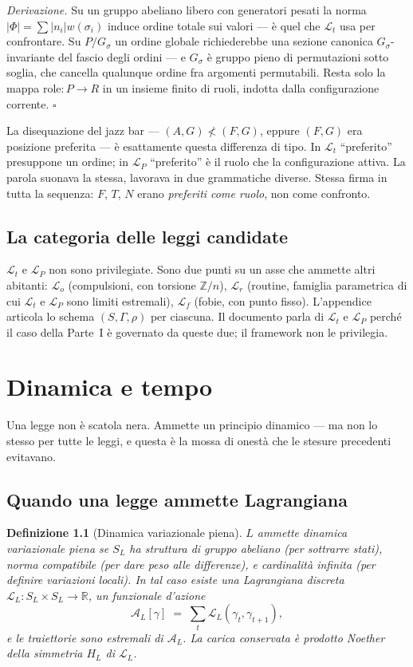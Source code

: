 \documentclass[
    oneside,                 %
    openany,                 %
    titlepage,
    11pt,
    a4paper,
    italian,
    DIV=14,                  %
    headinclude,
    footinclude=true,
    cleardoublepage=empty
]{scrbook}
\theoremstyle{ctplain}
\theoremstyle{ctdef}
\newtheorem{defn}[principio]{Definizione}
\theoremstyle{ctrem}
\newcommand{\Lt}{\mathcal{L}_t}
\newcommand{\LP}{\mathcal{L}_P}
\newcommand{\Lo}{\mathcal{L}_o}
\newcommand{\Lr}{\mathcal{L}_r}
\newcommand{\Lf}{\mathcal{L}_f}
\newcommand{\Phii}{\Phi}
\newcommand{\Gs}{G_{\sigma}}
\begin{document}
\emph{Derivazione.} Su un gruppo abeliano libero con generatori pesati la norma $|\Phii| = \sum |n_i| w(\sigma_i)$ induce ordine totale sui valori --- è quel che $\Lt$ usa per confrontare. Su $P/\Gs$ un ordine globale richiederebbe una sezione canonica $\Gs$-invariante del fascio degli ordini --- e $\Gs$ è gruppo pieno di permutazioni sotto soglia, che cancella qualunque ordine fra argomenti permutabili. Resta solo la mappa $\mathrm{role} : P \to R$ in un insieme finito di ruoli, indotta dalla configurazione corrente. $\square$

La disequazione del jazz bar --- $(A,G) \not< (F,G)$, eppure $(F,G)$ era posizione preferita --- è esattamente questa differenza di tipo. In $\Lt$ ``preferito'' presuppone un ordine; in $\LP$ ``preferito'' è il ruolo che la configurazione attiva. La parola suonava la stessa, lavorava in due grammatiche diverse. Stessa firma in tutta la sequenza: $F$, $T$, $N$ erano \emph{preferiti come ruolo}, non come confronto.

\section*{La categoria delle leggi candidate}

$\Lt$ e $\LP$ non sono privilegiate. Sono due punti su un asse che ammette altri abitanti: $\Lo$ (compulsioni, con torsione $\mathbb{Z}/n$), $\Lr$ (routine, famiglia parametrica di cui $\Lt$ e $\LP$ sono limiti estremali), $\Lf$ (fobie, con punto fisso). L'appendice articola lo schema $(S, \Gamma, \rho)$ per ciascuna. Il documento parla di $\Lt$ e $\LP$ perché il caso della Parte~I è governato da queste due; il framework non le privilegia.

\chapter{Dinamica e tempo}

Una legge non è scatola nera. Ammette un principio dinamico --- ma non lo stesso per tutte le leggi, e questa è la mossa di onestà che le stesure precedenti evitavano.

\section*{Quando una legge ammette Lagrangiana}

\begin{defn}[Dinamica variazionale piena]
$L$ ammette dinamica variazionale piena se $S_L$ ha struttura di gruppo abeliano (per sottrarre stati), norma compatibile (per dare peso alle differenze), e cardinalità infinita (per definire variazioni locali). In tal caso esiste una Lagrangiana discreta $\mathcal{L}_L : S_L \times S_L \to \mathbb{R}$, un funzionale d'azione
\[
\mathscr{A}_L[\gamma] \;=\; \sum_t \mathcal{L}_L(\gamma_t, \gamma_{t+1}),
\]
e le traiettorie sono estremali di $\mathscr{A}_L$. La carica conservata è prodotto Noether della simmetria $H_L$ di $\mathcal{L}_L$.
\end{defn}
\end{document}
